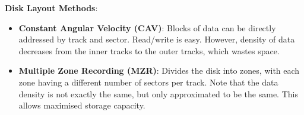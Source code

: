 \textbf{Disk Layout Methods}:
\begin{itemize}
    \item \textbf{Constant Angular Velocity (CAV)}: Blocks of data can be directly addressed
        by track and sector. Read/write is easy. However, density of data decreases from the
        inner tracks to the outer tracks, which wastes space.
    \item \textbf{Multiple Zone Recording (MZR)}: Divides the disk into zones, with each zone
        having a different number of sectors per track. Note that the data density is not
        exactly the same, but only approximated to be the same. This allows maximised storage
        capacity.
\end{itemize}